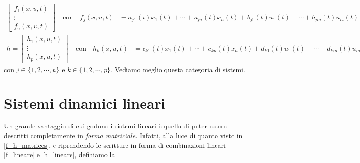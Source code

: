 \documentclass[a4paper]{report}
\begin{document}
\begin{itemize}
\begin{align}
\begin{bmatrix}
		f_1(x, u, t) \\
		\vdots \\
		f_n(x, u, t)
	\end{bmatrix} \quad \textrm{con} \quad f_j(x,u,t) & = a_{j1}(t)x_1(t) + \cdots + a_{jn}(t)x_n(t) + b_{j1}(t)u_1(t) + \cdots + b_{jm}(t)u_m(t)
\end{align}
\begin{align}
\label{h_lineare}
		h = \begin{bmatrix}
		h_1(x, u, t) \\
		\vdots \\
		h_p(x, u, t)
	\end{bmatrix} \quad \textrm{con} \quad h_k(x,u,t) & = c_{k1}(t)x_1(t) + \cdots + c_{kn}(t)x_n(t) + d_{k1}(t)u_1(t) + \cdots + d_{km}(t)u_m(t)
\end{align}
con $j \in \{1,2, \cdots, n\}$ e $k \in \{1,2, \cdots, p\}$. Vediamo meglio questa categoria di sistemi.
\end{itemize} 

\section{Sistemi dinamici lineari}
Un grande vantaggio di cui godono i sistemi lineari è quello di poter essere descritti completamente in \textit{forma matriciale.} Infatti, alla luce di quanto visto in \eqref{f_h_matrices}, e riprendendo le scritture in forma di combinazioni lineari \eqref{f_lineare} e \eqref{h_lineare}, definiamo la
\end{document}
